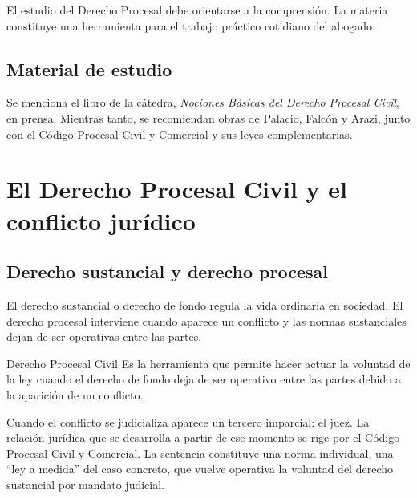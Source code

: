 \documentclass[12pt,oneside]{book}
\begin{document}
\begin{important}
El estudio del Derecho Procesal debe orientarse a la comprensión. La materia constituye una herramienta para el trabajo práctico cotidiano del abogado.
\end{important}

\section{Material de estudio}
Se menciona el libro de la cátedra, \textit{Nociones Básicas del Derecho Procesal Civil}, en prensa. Mientras tanto, se recomiendan obras de Palacio, Falcón y Arazi, junto con el Código Procesal Civil y Comercial y sus leyes complementarias.

\chapter{El Derecho Procesal Civil y el conflicto jurídico}
\section{Derecho sustancial y derecho procesal}
El derecho sustancial o derecho de fondo regula la vida ordinaria en sociedad. El derecho procesal interviene cuando aparece un conflicto y las normas sustanciales dejan de ser operativas entre las partes.

\begin{definition}{Derecho Procesal Civil}
Es la herramienta que permite hacer actuar la voluntad de la ley cuando el derecho de fondo deja de ser operativo entre las partes debido a la aparición de un conflicto.
\end{definition}

Cuando el conflicto se judicializa aparece un tercero imparcial: el juez. La relación jurídica que se desarrolla a partir de ese momento se rige por el Código Procesal Civil y Comercial. La sentencia constituye una norma individual, una ``ley a medida'' del caso concreto, que vuelve operativa la voluntad del derecho sustancial por mandato judicial.
\end{document}
